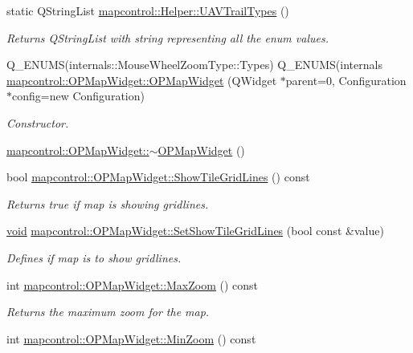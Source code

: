 \begin{DoxyCompactItemize}
static \-Q\-String\-List \hyperlink{group___o_p_map_widget_gad33e776681a2d3d4d44bef508d231336}{mapcontrol\-::\-Helper\-::\-U\-A\-V\-Trail\-Types} ()
\begin{DoxyCompactList}\small\item\em \-Returns \-Q\-String\-List with string representing all the enum values. \end{DoxyCompactList}\item 
\-Q\-\_\-\-E\-N\-U\-M\-S(internals\-::\-Mouse\-Wheel\-Zoom\-Type\-::\-Types) \*
\-Q\-\_\-\-E\-N\-U\-M\-S(internals \hyperlink{group___o_p_map_widget_ga390f25c0a1e661e1496be4b21c4b4796}{mapcontrol\-::\-O\-P\-Map\-Widget\-::\-O\-P\-Map\-Widget} (\-Q\-Widget $\ast$parent=0, \-Configuration $\ast$config=new \-Configuration)
\begin{DoxyCompactList}\small\item\em \-Constructor. \end{DoxyCompactList}\item 
\hyperlink{group___o_p_map_widget_gabdcfea44244e345b2e4c966cc8d8c3c6}{mapcontrol\-::\-O\-P\-Map\-Widget\-::$\sim$\-O\-P\-Map\-Widget} ()
\item 
bool \hyperlink{group___o_p_map_widget_ga206c68521bc221bc6db0e63e187c4481}{mapcontrol\-::\-O\-P\-Map\-Widget\-::\-Show\-Tile\-Grid\-Lines} () const 
\begin{DoxyCompactList}\small\item\em \-Returns true if map is showing gridlines. \end{DoxyCompactList}\item 
\hyperlink{group___u_a_v_objects_plugin_ga444cf2ff3f0ecbe028adce838d373f5c}{void} \hyperlink{group___o_p_map_widget_gae09f73466c8f5ba738db48600eab7635}{mapcontrol\-::\-O\-P\-Map\-Widget\-::\-Set\-Show\-Tile\-Grid\-Lines} (bool const \&value)
\begin{DoxyCompactList}\small\item\em \-Defines if map is to show gridlines. \end{DoxyCompactList}\item 
int \hyperlink{group___o_p_map_widget_ga20e653fc57f65044824fd9697d9111a8}{mapcontrol\-::\-O\-P\-Map\-Widget\-::\-Max\-Zoom} () const 
\begin{DoxyCompactList}\small\item\em \-Returns the maximum zoom for the map. \end{DoxyCompactList}\item 
int \hyperlink{group___o_p_map_widget_ga331965564954b53f6fa29812ae5c8f4b}{mapcontrol\-::\-O\-P\-Map\-Widget\-::\-Min\-Zoom} () const 

\end{DoxyCompactItemize}
